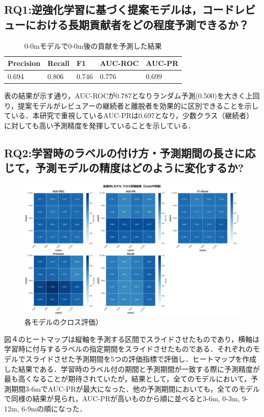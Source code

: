 \documentclass[submit,techrep,noauthor]{ipsj}
\begin{document}
\subsection{RQ1:逆強化学習に基づく提案モデルは，コードレビューにおける長期貢献者をどの程度予測できるか？}
\begin{table}[h]
    \centering
    \caption{0-0mモデルで0-0m後の貢献を予測した結果}
    \begin{tabularx}{\columnwidth}{XXXXX}
        \hline
       Precision & Recall & F1 & AUC-ROC & AUC-PR \\
       \hline
       0.694  & 0.806 & 0.746 & 0.776 & 0.699 \\ 
       \hline
    \end{tabularx}
\end{table}
表の結果が示す通り，AUC-ROCが0.787となりランダム予測(0.500)を大きく上回り，提案モデルがレビュアーの継続者と離脱者を効果的に区別できることを示している．本研究で重視しているAUC-PRは0.697となり，少数クラス（継続者）に対しても高い予測精度を発揮していることを示している．

\subsection{RQ2:学習時のラベルの付け方・予測期間の長さに応じて，予測モデルの精度はどのように変化するか?}
\begin{figure}[t]
    \centering
\includegraphics[width=1.0\textwidth]{./Hashimoto_fig/heatmap.pdf}
    \caption{各モデルのクロス評価）}
    \label{fig:result}
\end{figure}
図４のヒートマップは縦軸を予測する区間でスライドさせたものであり，横軸は学習時に付与するラベルの指定期間をスライドさせたものである．それぞれのモデルでスライドさせた予測期間を5つの評価指標で評価し．ヒートマップを作成した結果である．学習時のラベル付の期間と予測期間が一致する際に予測精度が最も高くなることが期待されていたが，結果として，全てのモデルにおいて，予測期間3-6mでAUC-PRが最大になった．他の予測期間においても，全てのモデルで同様の結果が見られ，AUC-PRが高いものから順に並べると3-6m, 0-3m, 9-12m, 6-9mの順になった．
\end{document}
